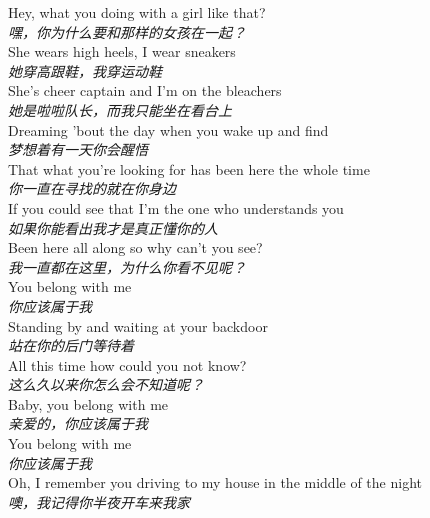 \begin{spacing}{1.5}
\begin{flushleft}
Hey, what you doing with a girl like that?\\
\textit{嘿，你为什么要和那样的女孩在一起？}\\[0.5em]

She wears high heels, I wear sneakers\\
\textit{她穿高跟鞋，我穿运动鞋}\\[0.5em]

She's cheer captain and I'm on the bleachers\\
\textit{她是啦啦队长，而我只能坐在看台上}\\[0.5em]

Dreaming 'bout the day when you wake up and find\\
\textit{梦想着有一天你会醒悟}\\[0.5em]

That what you're looking for has been here the whole time\\
\textit{你一直在寻找的就在你身边}\\[0.5em]

If you could see that I'm the one who understands you\\
\textit{如果你能看出我才是真正懂你的人}\\[0.5em]

Been here all along so why can't you see?\\
\textit{我一直都在这里，为什么你看不见呢？}\\[0.5em]

You belong with me\\
\textit{你应该属于我}\\[0.5em]

Standing by and waiting at your backdoor\\
\textit{站在你的后门等待着}\\[0.5em]

All this time how could you not know?\\
\textit{这么久以来你怎么会不知道呢？}\\[0.5em]

Baby, you belong with me\\
\textit{亲爱的，你应该属于我}\\[0.5em]

You belong with me\\
\textit{你应该属于我}\\[0.5em]

Oh, I remember you driving to my house in the middle of the night\\
\textit{噢，我记得你半夜开车来我家}\\[0.5em]


\end{flushleft}
\end{spacing}
